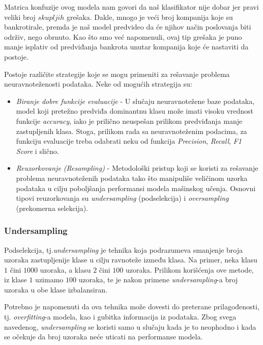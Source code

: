 \documentclass[12pt]{article}
\theoremstyle{definition}
\theoremstyle{remark}
\begin{document}
Matrica konfuzije ovog modela nam govori da naš klasifikator nije dobar jer pravi veliki broj $skupljih$ grešaka. Dakle, mnogo je veći broj kompanija koje su bankrotirale, premda je naš model predvideo da će njihov način poslovanja biti održiv, nego obrnuto. Kao što smo već napomenuli, ovaj tip grešaka je puno manje isplativ od predviđanja bankrota unutar kompanija koje će nastaviti da postoje.


Postoje različite strategije koje se mogu primeniti za rešavanje problema neuravnoteženosti podataka. Neke od mogućih strategija su:
\renewcommand\labelitemi{\tiny$\bullet$}
\begin{itemize}

    \item \emph{Biranje dobre funkcije evaluacije} - U slučaju neuravnotežene baze podataka, model koji pretežno predviđa dominantnu klasu može imati visoku vrednost funkcije   \emph{accuracy}, iako je prilično neuspešan prilikom predviđanja manje zastupljenih klasa. Stoga, prilikom rada sa neuravnoteženim podacima, za funkciju evaluacije treba odabrati neku od funkcija \emph{Precision}, \emph{Recall}, \emph{F1 Score} i slično.
    \item \emph{Reuzorkovanje (Resampling)} - Metodološki pristup koji se koristi za rešavanje problema neuravnoteženih podataka tako što manipuliše veličinom uzorka podataka u cilju poboljšanja performansi modela mašinskog učenja. Osnovni tipovi reuzorkovanja su \emph{undersampling} (podselekcija) i \emph{oversampling} (prekomerna selekcija). 
\end{itemize}



\subsubsection{Undersampling}

Podselekcija, tj.\emph{undersampling} je tehnika koja podrazumeva smanjenje broja uzoraka zastupljenije klase u cilju ravnoteže između klasa. Na primer, neka klasu $1$ čini $1000$ uzoraka, a klasu $2$ čini $100$ uzoraka. Prilikom korišćenja ove metode, iz klase $1$ uzimamo $100$ uzoraka, te je nakon primene \emph{undersampling}-a broj uzoraka u obe klase izbalansiran.

Potrebno je napomenuti da ova tehnika može dovesti do preterane prilagođenosti, tj. \emph{overfitting}-a modela, kao i gubitka informacija iz podataka. Zbog svega navedenog, \emph{undersampling} se koristi samo u slučaju kada je to neophodno i kada se očekuje da broj uzoraka neće uticati na performanse modela.
\end{document}
